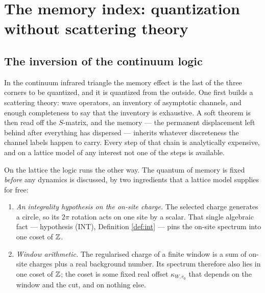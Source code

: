 %
\providecommand{\dephase}{\mathcal{D}}      %
\providecommand{\specres}{E}                %
\providecommand{\tr}{\operatorname{tr}}     %

\section{The memory index: quantization without scattering theory}
\label{sec:memory-index}

\subsection{The inversion of the continuum logic}

In the continuum infrared triangle the memory effect is the last of the three
corners to be quantized, and it is quantized from the outside. One first
builds a scattering theory: wave operators, an inventory of asymptotic
channels, and enough completeness to say that the inventory is exhaustive.
A soft theorem is then read off the $S$-matrix, and the memory --- the
permanent displacement left behind after everything has dispersed --- inherits
whatever discreteness the channel labels happen to carry. Every step of that
chain is analytically expensive, and on a lattice model of any interest not
one of the steps is available.

On the lattice the logic runs the other way. The quantum of memory is fixed
\emph{before} any dynamics is discussed, by two ingredients that a lattice
model supplies for free:

\begin{enumerate}
\item \emph{An integrality hypothesis on the on-site charge.} The selected
  charge generates a circle, so its $2\pi$ rotation acts on one site by a
  scalar. That single algebraic fact --- hypothesis (INT), Definition
  \ref{def:int} --- pins the on-site spectrum into one coset of $\mathbb{Z}$.
\item \emph{Window arithmetic.} The regularised charge of a finite window is a
  sum of on-site charges plus a real background number. Its spectrum
  therefore also lies in one coset of $\mathbb{Z}$; the coset is some fixed real
  offset $\kappa_{W,c_0}$ that depends on the window and the cut, and on
  nothing else.
\end{enumerate}

